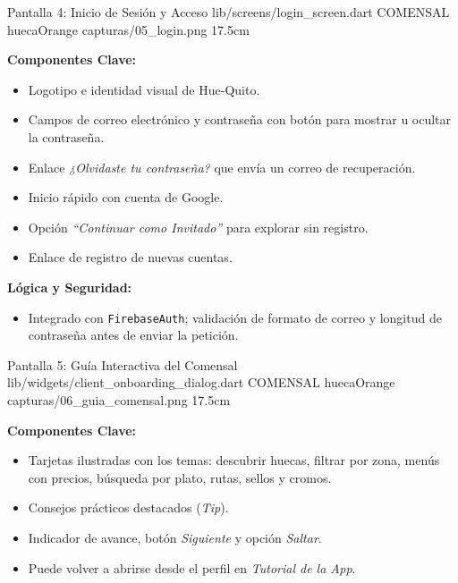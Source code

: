 \pantallashowcase
  {Pantalla 4: Inicio de Sesión y Acceso}
  {lib/screens/login_screen.dart}
  {COMENSAL}
  {huecaOrange}
  {capturas/05_login.png}
  {17.5cm}
  {

    \textbf{Componentes Clave:}
    \begin{itemize}[leftmargin=*, itemsep=2pt]
      \item Logotipo e identidad visual de Hue-Quito.
      \item Campos de correo electrónico y contraseña con botón para mostrar u ocultar la contraseña.
      \item Enlace \textit{¿Olvidaste tu contraseña?} que envía un correo de recuperación.
      \item Inicio rápido con cuenta de Google.
      \item Opción \textit{``Continuar como Invitado''} para explorar sin registro.
      \item Enlace de registro de nuevas cuentas.
    \end{itemize}
    \vspace{0.2cm}

    \textbf{Lógica y Seguridad:}
    \begin{itemize}[leftmargin=*, itemsep=2pt]
      \item Integrado con \texttt{FirebaseAuth}; validación de formato de correo y longitud de contraseña antes de enviar la petición.
    \end{itemize}
  }

\pantallashowcase
  {Pantalla 5: Guía Interactiva del Comensal}
  {lib/widgets/client\_onboarding\_dialog.dart}
  {COMENSAL}
  {huecaOrange}
  {capturas/06_guia_comensal.png}
  {17.5cm}
  {

    \textbf{Componentes Clave:}
    \begin{itemize}[leftmargin=*, itemsep=2pt]
      \item Tarjetas ilustradas con los temas: descubrir huecas, filtrar por zona, menús con precios, búsqueda por plato, rutas, sellos y cromos.
      \item Consejos prácticos destacados (\textit{Tip}).
      \item Indicador de avance, botón \textit{Siguiente} y opción \textit{Saltar}.
      \item Puede volver a abrirse desde el perfil en \textit{Tutorial de la App}.
    \end{itemize}
  }

